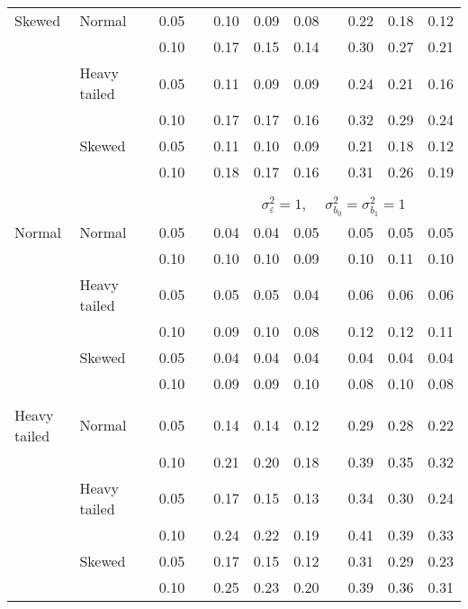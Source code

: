 \begin{table}[ht]
\begin{scriptsize}
\begin{center}
\begin{tabular}{ll p{.1cm} c p{.1cm} rrr p{.1cm} rrr}
Skewed       & Normal       && 0.05 &&  0.10 & 0.09 & 0.08 && 0.22 & 0.18 & 0.12 \\ 
             &              && 0.10 &&  0.17 & 0.15 & 0.14 && 0.30 & 0.27 & 0.21 \\ 
             & Heavy tailed && 0.05 &&  0.11 & 0.09 & 0.09 && 0.24 & 0.21 & 0.16 \\ 
             &              && 0.10 &&  0.17 & 0.17 & 0.16 && 0.32 & 0.29 & 0.24 \\ 
             & Skewed       && 0.05 &&  0.11 & 0.10 & 0.09 && 0.21 & 0.18 & 0.12 \\ 
             &              && 0.10 &&  0.18 & 0.17 & 0.16 && 0.31 & 0.26 & 0.19 \\ 

&&&&&&&&&&&\\
& && && \multicolumn{7}{c}{$\sigma_{\varepsilon}^2 = 1$, \ \ $\sigma_{b_0}^2 = \sigma_{b_1}^2 = 1$} \\ \cline{6-12}
\rowcolor{gray!20}Normal       & Normal       && 0.05 &&  0.04 & 0.04 & 0.05 && 0.05 & 0.05 & 0.05 \\ 
\rowcolor{gray!20}             &              && 0.10 &&  0.10 & 0.10 & 0.09 && 0.10 & 0.11 & 0.10 \\ 
\rowcolor{gray!20}             & Heavy tailed && 0.05 &&  0.05 & 0.05 & 0.04 && 0.06 & 0.06 & 0.06 \\ 
\rowcolor{gray!20}             &              && 0.10 &&  0.09 & 0.10 & 0.08 && 0.12 & 0.12 & 0.11 \\ 
\rowcolor{gray!20}             & Skewed       && 0.05 &&  0.04 & 0.04 & 0.04 && 0.04 & 0.04 & 0.04 \\ 
\rowcolor{gray!20}             &              && 0.10 &&  0.09 & 0.09 & 0.10 && 0.08 & 0.10 & 0.08 \\ 
             &&&&&&&&&&&\\
Heavy tailed & Normal       && 0.05 &&  0.14 & 0.14 & 0.12 && 0.29 & 0.28 & 0.22 \\ 
             &              && 0.10 &&  0.21 & 0.20 & 0.18 && 0.39 & 0.35 & 0.32 \\ 
             & Heavy tailed && 0.05 &&  0.17 & 0.15 & 0.13 && 0.34 & 0.30 & 0.24 \\ 
             &              && 0.10 &&  0.24 & 0.22 & 0.19 && 0.41 & 0.39 & 0.33 \\ 
             & Skewed       && 0.05 &&  0.17 & 0.15 & 0.12 && 0.31 & 0.29 & 0.23 \\ 
             &              && 0.10 &&  0.25 & 0.23 & 0.20 && 0.39 & 0.36 & 0.31 \\ 

\end{tabular}
\end{center}
\end{scriptsize}
\end{table}
